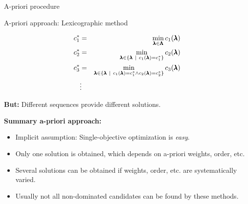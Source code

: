 \begin{frame}[allowframebreaks]{A-priori procedure}
\framebreak

A-priori approach: Lexicographic method

\begin{eqnarray*}
c_1^* &=& \min_{\pmb{\lambda} \in \pmb{\Lambda}} c_1(\pmb{\lambda})\\
c_2^* &=& \min_{\pmb{\lambda} \in \{\pmb{\lambda} ~|~ c_1(\pmb{\lambda}) = c_1^*\}} c_2(\pmb{\lambda}) \\
c_3^* &=& \min_{\pmb{\lambda} \in \{\pmb{\lambda} ~|~ c_1(\pmb{\lambda}) = c_1^* \land c_2(\pmb{\lambda}) = c_2^*\}} c_3(\pmb{\lambda}) \\
&\vdots&
\end{eqnarray*}

    \textbf{But:} Different sequences provide different solutions.

\framebreak

\textbf{Summary a-priori approach:}
\begin{itemize}
\item Implicit assumption: Single-objective optimization is \emph{easy}.
\item Only one solution is obtained, which depends on a-priori weights, order, etc.
\item Several solutions can be obtained if weights, order, etc. are systematically varied.
\item Usually not all non-dominated candidates can be found by these methods.
\end{itemize}

\end{frame}

